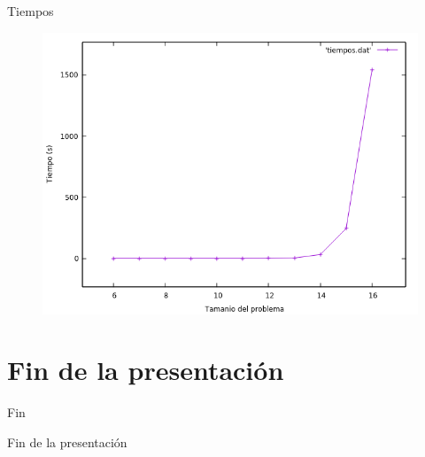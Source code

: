 \documentclass{beamer}
\begin{document}
\begin{frame}[fragile]{Tiempos}
\begin{figure}[H]
\centering
\includegraphics[scale=0.5]{tiempos.png}
\end{figure}
\end{frame}

\section*{Fin de la presentación}

\begin{frame}{Fin}
\begin{center}
\huge{Fin de la presentación}
\end{center}
\end{frame}
\end{document}
